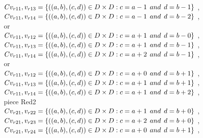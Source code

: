 \\$C{v_{r11},v_{r13}}=\{((a,b),(c,d))\in D\times D: c = a - 1\hspace{1ex} and \hspace{1ex}  d = b - 1 \}$ , 
\\$C{v_{r11},v_{r14}}=\{((a,b),(c,d))\in D\times D: c = a - 1\hspace{1ex} and \hspace{1ex}  d = b - 2 \}$ , 
\\or
\\$C{v_{r11},v_{r12}}=\{((a,b),(c,d))\in D\times D: c = a + 1\hspace{1ex} and \hspace{1ex}  d = b - 0 \}$ , 
\\$C{v_{r11},v_{r13}}=\{((a,b),(c,d))\in D\times D: c = a + 1\hspace{1ex} and \hspace{1ex}  d = b - 1 \}$ , 
\\$C{v_{r11},v_{r14}}=\{((a,b),(c,d))\in D\times D: c = a + 2\hspace{1ex} and \hspace{1ex}  d = b - 1 \}$ , 
\\or
\\$C{v_{r11},v_{r12}}=\{((a,b),(c,d))\in D\times D: c = a + 0\hspace{1ex} and \hspace{1ex}  d = b + 1 \}$ , 
\\$C{v_{r11},v_{r13}}=\{((a,b),(c,d))\in D\times D: c = a + 1\hspace{1ex} and \hspace{1ex}  d = b + 1 \}$ , 
\\$C{v_{r11},v_{r14}}=\{((a,b),(c,d))\in D\times D: c = a + 1\hspace{1ex} and \hspace{1ex}  d = b + 2 \}$ , 
\\ piece Red2 
\\$C{v_{r21},v_{r22}}=\{((a,b),(c,d))\in D\times D: c = a + 1\hspace{1ex} and \hspace{1ex}  d = b + 0 \}$ , 
\\$C{v_{r21},v_{r23}}=\{((a,b),(c,d))\in D\times D: c = a + 2\hspace{1ex} and \hspace{1ex}  d = b + 0 \}$ , 
\\$C{v_{r21},v_{r24}}=\{((a,b),(c,d))\in D\times D: c = a + 0\hspace{1ex} and \hspace{1ex}  d = b + 1 \}$ , 
